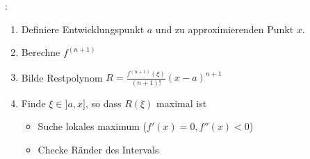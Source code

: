 \documentclass[7pt,landscape, margin = 0.1mm]{article}
\newcommand{\KRZ}[2]{\vspace{1mm} \hline \vspace{1mm} \color{chaptercolor}{RC #1}:\color{black} \   \hspace{0.2cm}\vspace{1mm}   {\begin{minipage}{20em}
#2 \end{minipage}} \vspace{1mm}  \hline \vspace{1mm}  \\}
\begin{document}
\begin{multicols}{4}
\begin{flushleft}
{\begin{enumerate}
\end{enumerate}}
\KRZ{Finde Fehler des Taylorpolynoms}{ \begin{enumerate}
\item Definiere Entwicklungspunkt $a$ und zu approximierenden Punkt $x$.
\item Berechne $f^{(n+1)}$
\item Bilde Restpolynom $R = \frac{f^{(n+1)}(\xi)}{(n+1) !}(x-a)^{n+1}$
\item Finde $\xi \in ]a,x]$, so dass $R(\xi)$ maximal ist
\begin{itemize}
\item Suche lokales maximum ($f'(x)=0, f''(x)<0$)
\item Checke Ränder des Intervals
\end{itemize}

\end{enumerate}}





\end{flushleft}
\end{multicols}
\end{document}
